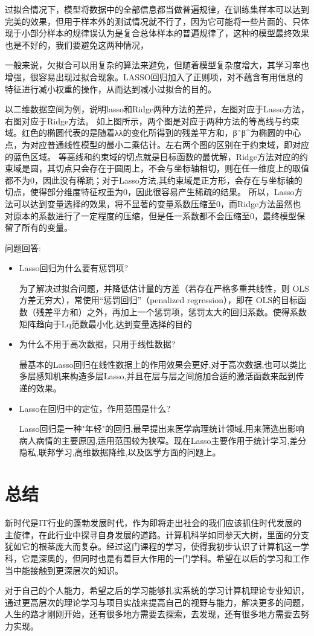 \documentclass{article}
\begin{document}
过拟合情况下，模型将数据中的全部信息都当做普遍规律，在训练集样本可以达到完美的效果，但用于样本外的测试情况就不行了，因为它可能将一些片面的、只体现于小部分样本的规律误认为是复合总体样本的普遍规律了，这种的模型最终效果也是不好的，我们要避免这两种情况，

一般来说，欠拟合可以用复杂的算法来避免，但随着模型复杂度增大，其学习率也增强，很容易出现过拟合现象。LASSO回归加入了正则项，对不蕴含有用信息的特征进行减小权重的操作，从而达到减小过拟合的目的。

以二维数据空间为例，说明lasso和Ridge两种方法的差异，左图对应于Lasso方法，右图对应于Ridge方法。
如上图所示，两个图是对应于两种方法的等高线与约束域。红色的椭圆代表的是随着λλ的变化所得到的残差平方和，βˆβ^为椭圆的中心点，为对应普通线性模型的最小二乘估计。左右两个图的区别在于约束域，即对应的蓝色区域。
等高线和约束域的切点就是目标函数的最优解，Ridge方法对应的约束域是圆，其切点只会存在于圆周上，不会与坐标轴相切，则在任一维度上的取值都不为0，因此没有稀疏；对于Lasso方法,其约束域是正方形，会存在与坐标轴的切点，使得部分维度特征权重为0，因此很容易产生稀疏的结果。
所以，Lasso方法可以达到变量选择的效果，将不显著的变量系数压缩至0，而Ridge方法虽然也对原本的系数进行了一定程度的压缩，但是任一系数都不会压缩至0，最终模型保留了所有的变量。


问题回答:
\begin{itemize}
    \item Lasso回归为什么要有惩罚项? 
    
    为了解决过拟合问题，并降低估计量的方差（若存在严格多重共线性，则 OLS 方差无穷大），常使用“惩罚回归”（penalized regression），即在 OLS的目标函数（残差平方和）之外，再加上一个惩罚项，惩罚太大的回归系数。使得系数矩阵趋向于Lq范数最小化,达到变量选择的目的
    \item 为什么不用于高次数据，只用于线性数据?
    
    最基本的Lasso回归在线性数据上的作用效果会更好,对于高次数据,也可以类比多层感知机来构造多层Lasso,并且在层与层之间施加合适的激活函数来起到传递的效果。
    
    \item Lasso在回归中的定位，作用范围是什么?
    
    Lasso回归是一种"年轻"的回归,最早提出来医学病理统计领域,用来筛选出影响病人病情的主要原因,适用范围较为狭窄。现在Lasso主要作用于统计学习,差分隐私,联邦学习,高维数据降维,以及医学方面的问题上。
\end{itemize}


\section{总结}
新时代是IT行业的蓬勃发展时代，作为即将走出社会的我们应该抓住时代发展的主旋律，在此行业中探寻自身发展的道路。计算机科学如同参天大树，里面的分支犹如它的根茎庞大而复杂。经过这门课程的学习，使得我初步认识了计算机这一学科，它是深奥的，但同时也是有着巨大作用的一门学科。希望在以后的学习和工作当中能接触到更深层次的知识。\par
对于自己的个人能力，希望之后的学习能够扎实系统的学习计算机理论专业知识，通过更高层次的理论学习与项目实战来提高自己的视野与能力，解决更多的问题，人生的路才刚刚开始，还有很多地方需要去探索，去发现，还有很多地方需要去努力实现。\par
\end{document}
